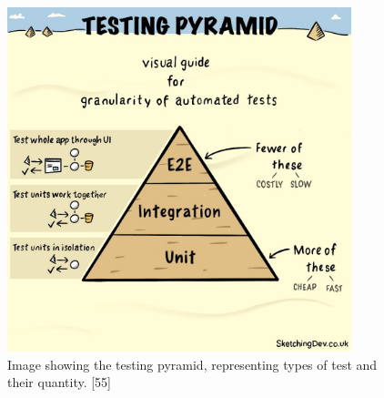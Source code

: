   \begin{figure}[H]
    \centering
    \includegraphics[width=10cm]{assets/testingPyramid.jpg}
    \caption{Image showing the testing pyramid, representing types of test and their quantity. [55]}
    \label{fig:testingPyramid}
  \end{figure}

